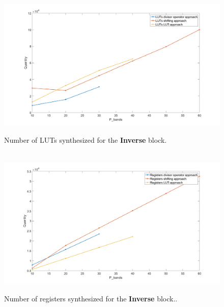 \begin{figure}[H]

\hbox{\hspace*{-2cm}                                                           
   \includegraphics[scale=0.3]{images/syntese_resultat/inverse/number_of_luts.png}}
  \caption{Number of LUTs synthesized for the \textbf{Inverse} block. } 
  \label{fig:luts_inverse}
\end{figure}


\begin{figure}[H]

\hbox{\hspace*{-2cm}                                                           
   \includegraphics[scale=0.3]{images/syntese_resultat/inverse/number_of_registers.png}}
  \caption{Number of registers synthesized  for the \textbf{Inverse} block.. } 
  \label{fig:registers_inverse}
\end{figure}




